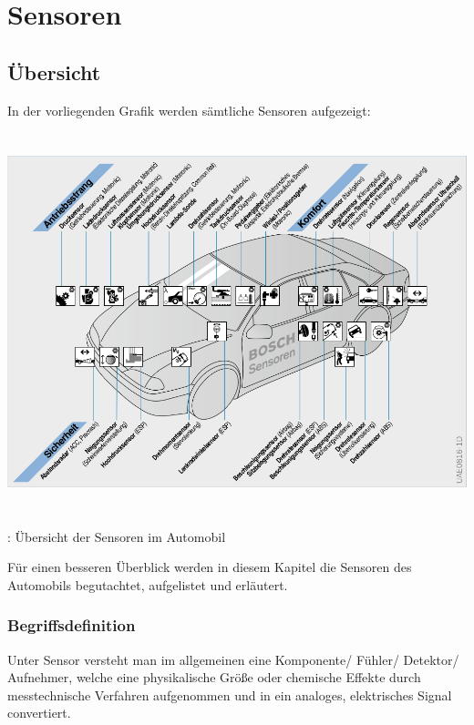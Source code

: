 \documentclass{article}
\begin{document}
	\section{Sensoren}
	
		\subsection{Übersicht} 
		
		In der vorliegenden Grafik werden sämtliche Sensoren aufgezeigt:
			\begin{center}
					\includegraphics[width=15cm, height=11cm] {Images/Kapitel5/sensor_uebersicht.png}
				\caption{\cite{TS01}: Übersicht der Sensoren im Automobil}
	
			\end{center}
			
			\begin{flushleft}	
			
			Für einen besseren Überblick werden in diesem Kapitel die Sensoren des Automobils begutachtet, aufgelistet und erläutert.	
			
			\end{flushleft}	
			
				\subsubsection{Begriffsdefinition}
					
					Unter Sensor versteht man im allgemeinen eine Komponente/ Fühler/ Detektor/ Aufnehmer, welche eine physikalische Größe oder chemische Effekte durch messtechnische Verfahren aufgenommen und in ein analoges, elektrisches Signal convertiert.
\end{document}
